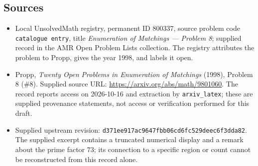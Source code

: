 \documentclass[11pt]{article}
\begin{document}
\subsection{Sources}
\begin{itemize}
\item Local UnsolvedMath registry, permanent ID \(800337\), source problem code \texttt{catalogue entry}, title \emph{Enumeration of Matchings --- Problem 8}; supplied record in the AMR Open Problem Lists collection. The registry attributes the problem to Propp, gives the year 1998, and labels it open.
\item Propp, \emph{Twenty Open Problems in Enumeration of Matchings} (1998), Problem 8 (\#8). Supplied source URL: \url{https://arxiv.org/abs/math/9801060}. The record reports access on 2026-10-16 and extraction by \texttt{arxiv\_latex}; these are supplied provenance statements, not access or verification performed for this draft.
\item Supplied upstream revision: \texttt{d371ee917ac9647fbb06cd6fc529deec6f3dda82}. The supplied excerpt contains a truncated numerical display and a remark about the prime factor \(73\); its connection to a specific region or count cannot be reconstructed from this record alone.
\end{itemize}
\end{document}
